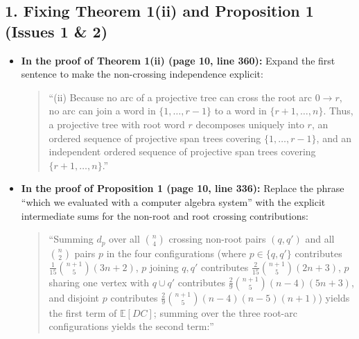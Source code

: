 \documentclass[11pt,a4paper]{article}
\begin{document}
\subsection*{1. Fixing Theorem 1(ii) and Proposition 1 (Issues 1 \& 2)}
\begin{itemize}
    \item \textbf{In the proof of Theorem 1(ii) (page 10, line 360):} Expand the first sentence to make the non-crossing independence explicit:
    \begin{quote}
        ``(ii) Because no arc of a projective tree can cross the root arc $0 \to r$, no arc can join a word in $\{1,\dots,r-1\}$ to a word in $\{r+1,\dots,n\}$. Thus, a projective tree with root word $r$ decomposes uniquely into $r$, an ordered sequence of projective span trees covering $\{1,\dots,r-1\}$, and an independent ordered sequence of projective span trees covering $\{r+1,\dots,n\}$.''
    \end{quote}
    \item \textbf{In the proof of Proposition 1 (page 10, line 336):} Replace the phrase ``which we evaluated with a computer algebra system'' with the explicit intermediate sums for the non-root and root crossing contributions:
    \begin{quote}
        ``Summing $d_p$ over all $\binom{n}{4}$ crossing non-root pairs $(q,q')$ and all $\binom{n}{2}$ pairs $p$ in the four configurations (where $p \in \{q,q'\}$ contributes $\frac{1}{15}\binom{n+1}{5}(3n+2)$, $p$ joining $q,q'$ contributes $\frac{2}{15}\binom{n+1}{5}(2n+3)$, $p$ sharing one vertex with $q\cup q'$ contributes $\frac{2}{9}\binom{n+1}{5}(n-4)(5n+3)$, and disjoint $p$ contributes $\frac{2}{9}\binom{n+1}{5}(n-4)(n-5)(n+1)$) yields the first term of $\mathbb{E}[DC]$; summing over the three root-arc configurations yields the second term:''
    \end{quote}
\end{itemize}
\end{document}
